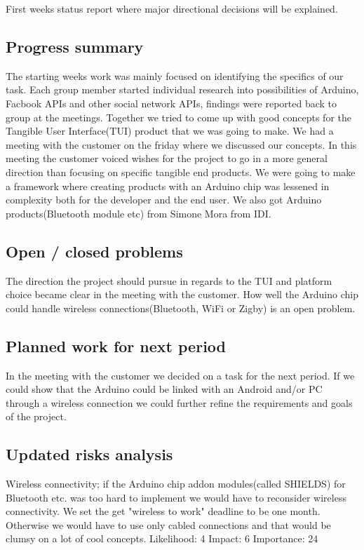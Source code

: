 First weeks status report where major directional decisions will be explained.

\subsection{Progress summary}
The starting weeks work was mainly focused on identifying the specifics of our task. Each group member started individual research into possibilities of Arduino, Facbook APIs and other social network APIs, findings were reported back to group at the meetings.
Together we tried to come up with good concepts for the Tangible User Interface(TUI) product that we was going to make. We had a meeting with the customer on the friday where we discussed our concepts. In this meeting the customer voiced wishes for the project to go in a more general direction than focusing on specific tangible end products. We were going to make a framework where creating products with an Arduino chip was lessened in complexity both for the developer and the end user.
We also got Arduino products(Bluetooth module etc) from Simone Mora from IDI.

\subsection{Open / closed problems}
The direction the project should pursue in regards to the TUI and platform choice became clear in the meeting with the customer.
How well the Arduino chip could handle wireless connections(Bluetooth, WiFi or Zigby) is an open problem.

\subsection{Planned work for next period}
In the meeting with the customer we decided on a task for the next period. If we could show that the Arduino could be linked with an Android and/or PC through a wireless connection we could further refine the requirements and goals of the project. 

\subsection{Updated risks analysis}
Wireless connectivity; if the Arduino chip addon modules(called SHIELDS) for Bluetooth etc. was too hard to implement we would have to reconsider wireless connectivity. We set the get "wireless to work" deadline to be one month. Otherwise we would have to use only cabled connections and that would be clumsy on a lot of cool concepts.
 Likelihood: 4 Impact: 6 Importance: 24
